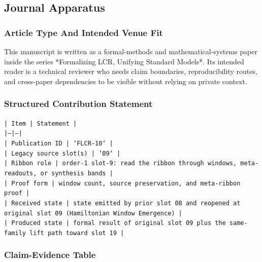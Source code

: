 \documentclass[11pt]{article}
\begin{document}
\subsection*{Journal Apparatus}

\subsubsection*{Article Type And Intended Venue Fit}

This manuscript is written as a formal-methods and mathematical-systems paper
inside the series *Formalizing LCR, Unifying Standard Models*. Its intended
reader is a technical reviewer who needs claim boundaries, reproducibility
routes, and cross-paper dependencies to be visible without relying on private
context.

\subsubsection*{Structured Contribution Statement}

\noindent\texttt{| Item | Statement |}\\
\noindent\texttt{|---|---|}\\
\noindent\texttt{| Publication ID | `FLCR-10` |}\\
\noindent\texttt{| Legacy source slot(s) | `09` |}\\
\noindent\texttt{| Ribbon role | order-1 slot-9: read the ribbon through windows, meta-readouts, or synthesis bands |}\\
\noindent\texttt{| Proof form | window count, source preservation, and meta-ribbon proof |}\\
\noindent\texttt{| Received state | state emitted by prior slot 08 and reopened at original slot 09 (Hamiltonian Window Emergence) |}\\
\noindent\texttt{| Produced state | formal result of original slot 09 plus the same-family lift path toward slot 19 |}\\

\subsubsection*{Claim-Evidence Table}
\end{document}
